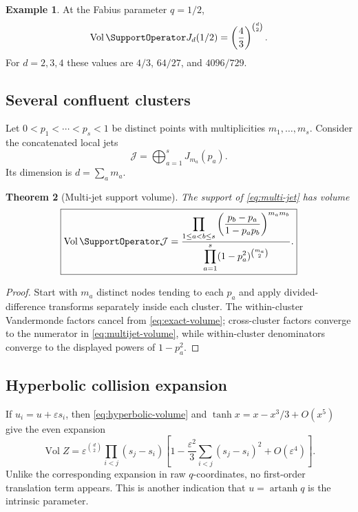 \documentclass[11pt,a4paper]{article}
\newtheorem{theorem}{Theorem}[section]
\theoremstyle{definition}
\newtheorem{example}[theorem]{Example}
\theoremstyle{remark}
\newcommand{\Vol}{\operatorname{Vol}}
\newcommand{\atanh}{\operatorname{artanh}}
\begin{document}
\begin{example}
At the Fabius parameter $q=1/2$,
\begin{equation}
  \Vol\SupportOperator J_d(1/2)
   =\left(\frac43\right)^{\binom d2}.
  \label{eq:Fabius-jet-volume}
\end{equation}
For $d=2,3,4$ these values are $4/3$, $64/27$, and $4096/729$.
\end{example}

\subsection{Several confluent clusters}

Let $0<p_1<\cdots<p_s<1$ be distinct points with multiplicities $m_1,\ldots,m_s$.  Consider the concatenated local jets
\begin{equation}
  \mathcal J=\bigoplus_{a=1}^sJ_{m_a}(p_a).
  \label{eq:multi-jet}
\end{equation}
Its dimension is $d=\sum_am_a$.

\begin{theorem}[Multi-jet support volume]
\label{thm:multijet-volume}
The support of \eqref{eq:multi-jet} has volume
\begin{equation}
 \boxed{
 \Vol\SupportOperator\mathcal J
  =\frac{\displaystyle
     \prod_{1\le a<b\le s}
       \left(\dfrac{p_b-p_a}{1-p_ap_b}\right)^{m_am_b}}
    {\displaystyle
     \prod_{a=1}^s
       (1-p_a^2)^{\binom{m_a}{2}}}.}
 \label{eq:multijet-volume}
\end{equation}
\end{theorem}

\begin{proof}
Start with $m_a$ distinct nodes tending to each $p_a$ and apply divided-difference transforms separately inside each cluster.  The within-cluster Vandermonde factors cancel from \eqref{eq:exact-volume}; cross-cluster factors converge to the numerator in \eqref{eq:multijet-volume}, while within-cluster denominators converge to the displayed powers of $1-p_a^2$.
\end{proof}

\subsection{Hyperbolic collision expansion}

If $u_i=u+\varepsilon s_i$, then \eqref{eq:hyperbolic-volume} and $\tanh x=x-x^3/3+O(x^5)$ give the even expansion
\begin{equation}
 \Vol Z
  =\varepsilon^{\binom d2}
    \prod_{i<j}(s_j-s_i)
    \left[
      1-\frac{\varepsilon^2}{3}
        \sum_{i<j}(s_j-s_i)^2
      +O(\varepsilon^4)
    \right].
 \label{eq:hyperbolic-collision-expansion}
\end{equation}
Unlike the corresponding expansion in raw $q$-coordinates, no first-order translation term appears.  This is another indication that $u=\atanh q$ is the intrinsic parameter.
\end{document}
